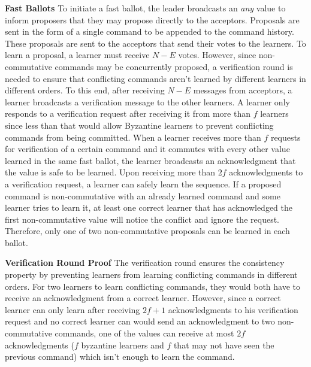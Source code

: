 \textbf{Fast Ballots} To initiate a fast ballot, the leader broadcasts an \textit{any} value to inform proposers that they may propose directly to the acceptors. Proposals are sent in the form of a single command to be appended to the command history. These proposals are sent to the acceptors that send their votes to the learners. To learn a proposal, a learner must receive $N-E$ votes. However, since non-commutative commands may be concurrently proposed, a verification round is needed to ensure that conflicting commands aren't learned by different learners in different orders. To this end, after receiving $N-E$ messages from acceptors, a learner broadcasts a verification message to the other learners. A learner only responds to a verification request after receiving it from more than $f$ learners since less than that would allow Byzantine learners to prevent conflicting commands from being committed. When a learner receives more than $f$ requests for verification of a certain command and it commutes with every other value learned in the same fast ballot, the learner broadcasts an acknowledgment that the value is safe to be learned. Upon receiving more than $2f$ acknowledgments to a verification request, a learner can safely learn the sequence. If a proposed command is non-commutative with an already learned command and some learner tries to learn it, at least one correct learner that has acknowledged the first non-commutative value will notice the conflict and ignore the request. Therefore, only one of two non-commutative proposals can be learned in each ballot. \par
\textbf{Verification Round Proof} The verification round ensures the consistency property by preventing learners from learning conflicting commands in different orders. For two learners to learn conflicting commands, they would both have to receive an acknowledgment from a correct learner. However, since a correct learner can only learn after receiving $2f+1$ acknowledgments to his verification request and no correct learner can would send an acknowledgment to two non-commutative commands, one of the values can receive at most $2f$ acknowledgments ($f$ byzantine learners and $f$ that may not have seen the previous command) which isn't enough to learn the command.